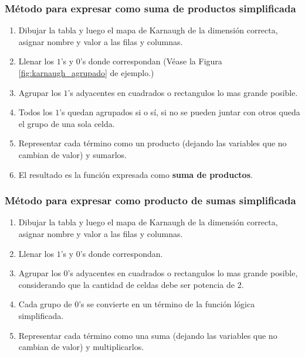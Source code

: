 \documentclass{article}
\begin{document}
\subsubsection*{Método para expresar como suma de productos simplificada}
\begin{mdframed}[backgroundcolor=yellow!40,shadow=true,shadowsize=2pt,roundcorner=2pt]
    \begin{enumerate}
        \item Dibujar la tabla y luego el mapa de Karnaugh de la dimensión correcta, asignar nombre y valor a las filas y columnas.
        \item Llenar los $1$'s y $0$'s donde correspondan (Véase la Figura \ref{fig:karnaugh_agrupado} de ejemplo.)
        \item Agrupar los $1$'s adyacentes en cuadrados o rectangulos lo mas grande posible.
        \item Todos los $1$'s quedan agrupados si o sí, si no se pueden juntar con otros queda el grupo de una sola celda.
        \item Representar cada término como un producto (dejando las variables que no cambian de valor) y sumarlos.
        \item El resultado es la función expresada como \textbf{suma de productos}.
    \end{enumerate}
\end{mdframed}

\subsubsection*{Método para expresar como producto de sumas simplificada}
\begin{mdframed}[backgroundcolor=yellow!40,shadow=true,shadowsize=2pt,roundcorner=2pt]
    \begin{enumerate}
        \item Dibujar la tabla y luego el mapa de Karnaugh de la dimensión correcta, asignar nombre y valor a las filas y columnas.
        \item Llenar los $1$'s y $0$'s donde correspondan.
        \item Agrupar los $0$'s adyacentes en cuadrados o rectangulos lo mas grande posible, considerando que la cantidad de celdas debe ser potencia de 2.
        \item Cada grupo de $0$'s se convierte en un término de la función lógica simplificada.
        \item Representar cada término como una suma (dejando las variables que no cambian de valor) y multiplicarlos.
    \end{enumerate}
\end{mdframed}
\end{document}

